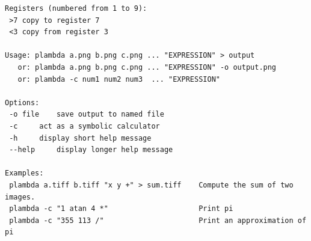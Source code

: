 \begin{verbatim}
Registers (numbered from 1 to 9):
 >7	copy to register 7
 <3	copy from register 3

Usage: plambda a.png b.png c.png ... "EXPRESSION" > output
   or: plambda a.png b.png c.png ... "EXPRESSION" -o output.png
   or: plambda -c num1 num2 num3  ... "EXPRESSION"

Options:
 -o file	save output to named file
 -c		act as a symbolic calculator
 -h		display short help message
 --help		display longer help message

Examples:
 plambda a.tiff b.tiff "x y +" > sum.tiff    Compute the sum of two images.
 plambda -c "1 atan 4 *"                     Print pi
 plambda -c "355 113 /"                      Print an approximation of pi
 \end{verbatim}



